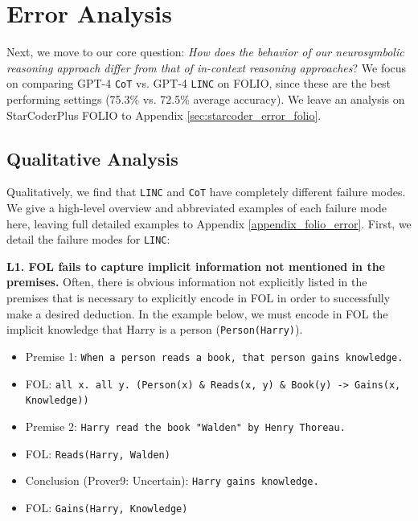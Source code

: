 \documentclass[11pt]{article}
\begin{document}
\section{Error Analysis}
\label{sec:error_analysis}
Next, we move to our core question: \textit{How does the behavior of our neurosymbolic reasoning approach differ from that of in-context reasoning approaches}?
We focus on comparing GPT-4 \texttt{CoT} vs. GPT-4 \texttt{LINC} on FOLIO, since these are the best performing settings (75.3\% vs. 72.5\% average accuracy). We leave an analysis on StarCoderPlus FOLIO to Appendix \ref{sec:starcoder_error_folio}.

\subsection{Qualitative Analysis} \label{sec:error_qualitative}
Qualitatively, we find that \texttt{LINC} and \texttt{CoT} have completely different failure modes. We give a high-level overview and abbreviated examples of each failure mode here, leaving full detailed examples to Appendix \ref{appendix_folio_error}. First, we detail the failure modes for \texttt{LINC}:

\textbf{L1. FOL fails to capture implicit information not mentioned in the premises.} Often, there is obvious information not explicitly listed in the premises that is necessary to explicitly encode in FOL in order to successfully make a desired deduction. In the example below, we must encode in FOL the implicit knowledge that Harry is a person (\texttt{Person(Harry)}).

\begin{itemize}
    \item[] \small Premise 1: \texttt{When a person reads a book, that person gains knowledge.}
    \item[] \small FOL: \texttt{all x. all y. (Person(x) \& Reads(x, y) \& Book(y) -> Gains(x, Knowledge))}
    \item[] \small Premise 2: \texttt{Harry read the book "Walden" by Henry Thoreau.}
    \item[] \small FOL: \texttt{Reads(Harry, Walden)}
    \item[] \small Conclusion (Prover9: Uncertain): \texttt{Harry gains knowledge.}
    \item[] \small FOL: \texttt{Gains(Harry, Knowledge)}
\end{itemize}
\end{document}
